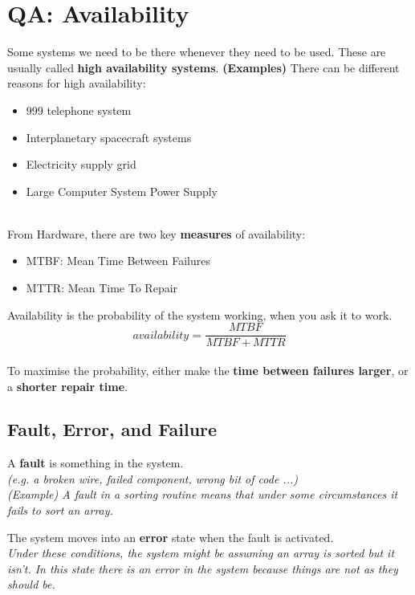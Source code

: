 \documentclass[a4paper]{article}
\begin{document}
\section{QA: Availability}
Some systems we need to	be there whenever they need to be used.	These are usually called \textbf{high availability systems}.	
\textbf{(Examples)} There can be different reasons for high availability:	
\begin{itemize}
\item{999 telephone system}
\item{Interplanetary spacecraft systems}
\item{Electricity supply grid}
\item{Large Computer System Power Supply}\\\\
\end{itemize}

From Hardware, there are two key \textbf{measures} of availability:
\begin{itemize}
\item{MTBF: Mean Time Between Failures}
\item{MTTR: Mean Time To Repair}\\
\end{itemize}
Availability is the probability of the system working, when you ask it to work.\\

$$\textit{availability = }\frac{MTBF}{MTBF+MTTR}$$\\

To maximise the probability, either make the \textbf{time between failures larger}, or a \textbf{shorter repair time}.
\newline
\subsection{Fault, Error, and Failure}
A \textbf{fault} is something in the system.\\
\textit{(e.g. a broken wire, failed component, wrong bit of code ...)}\\
\textit{(Example) A fault in a sorting routine means that under some circumstances it fails to sort an array.}

The system moves into an \textbf{error} state when the fault is activated.\\
\textit{Under these conditions, the system might be assuming an array is sorted but it isn’t.  In this state there is an error in the system because things are not as they should be.}
\end{document}
